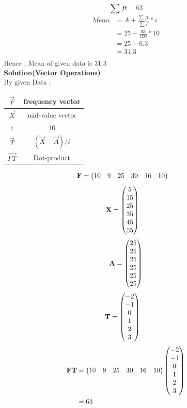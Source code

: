 \documentclass[journal,12pt,twocolumn]{IEEEtran}
\begin{document}
\begin{equation*}
\sum ft = 63
\end{equation*}
\begin{align*}
Mean & = A + \frac{ \sum ft }{\sum f} * i\\
     & = 25 + \frac{63}{100} * 10\\
     & = 25 + 6.3\\
     & = 31.3\\\
\end{align*}
Hence , Mean of given data is 31.3\\
\textbf{Solution(Vector Operations)}\\
By given Data :\\
\begin{table}[h!]
\center
{
\begin{tabular}{|c|c|}
\hline
$\vec{F}$ & frequency vector\\
\hline
$\vec{X}$ & mid-value vector\\
\hline
i &  10\\
\hline
$\vec{T}$ &  $(\vec{X}-\vec{A})/i$\\
\hline
$\vec{F}\vec{T}$ &  Dot-product\\
\hline
\end{tabular}
}
\end{table}
\begin{align}
\mathbf{F} & = 
\begin{pmatrix}10 & 9 & 25 & 30 & 16 & 10\end{pmatrix}
\end{align}
\begin{align}
\mathbf{X} & = 
\begin{pmatrix}5 \\ 15 \\ 25 \\ 35 \\ 45 \\ 55\end{pmatrix}
\end{align}
\begin{align}
\mathbf{A} = 
\begin{pmatrix}25\\25\\25\\25\\25\\25\end{pmatrix}
\end{align}
\begin{align}
\mathbf{T} & =
\begin{pmatrix}-2 \\ -1 \\ 0 \\ 1 \\ 2 \\ 3 \end{pmatrix}
\end{align}
\begin{align}
\mathbf{F}\mathbf{T}  & =\begin{pmatrix}10 & 9 & 25 & 30 & 16 & 10\end{pmatrix}\begin{pmatrix}-2\\-1\\0\\1\\2\\3\end{pmatrix}\\ 
\nonumber& = 63
\end{align}
\end{document}
